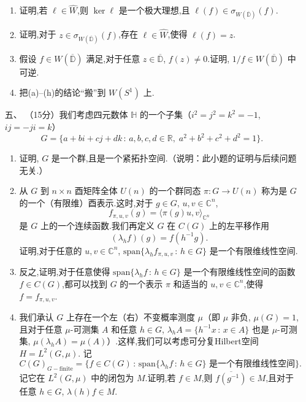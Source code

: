 \begin{enumerate}
\begin{enumerate}[label=(\alph*)]
\item 证明,若 $\ell\in \widehat{W}$,则 $\ker \ell$ 是一个极大理想,且 $\ell(f)\in \sigma_{W(\overline{\mathbb{D}})}(f)$.

\item 证明,对于 $z\in \sigma_{W(\overline{\mathbb{D}})}(f)$,存在 $\ell\in \widehat{W}$,使得 $\ell(f)=z$.

\item 假设 $f\in W(\overline{\mathbb{D}})$ 满足,对于任意 $z\in \overline{\mathbb{D}}$, $f(z)\neq 0$.证明, $1/f\in W(\overline{\mathbb{D}})$ 中可逆.

\item 把(a)--(h)的结论“搬”到 $W(S^1)$ 上.
\end{enumerate}

\item[五、]（15分）我们考虑四元数体 $\mathbb{H}$ 的一个子集（$i^2=j^2=k^2=-1$, $ij=-ji=k$）
$$
G=\{a+bi+cj+dk\,:\, a,b,c,d\in\mathbb{R},\; a^2+b^2+c^2+d^2=1\}.
$$

\begin{enumerate}[label=(\alph*)]
\item 证明, $G$ 是一个群,且是一个紧拓扑空间.（说明：此小题的证明与后续问题无关.）

\item 从 $G$ 到 $n\times n$ 酉矩阵全体 $U(n)$ 的一个群同态 $\pi:G\to U(n)$ 称为是 $G$ 的一个（有限维）酉表示.这时,对于 $g\in G$, $u,v\in \mathbb{C}^n$,
$$
f_{\pi,u,v}(g)=\langle \pi(g)u,v\rangle_{\mathbb{C}^n}
$$
是 $G$ 上的一个连续函数.我们再定义 $G$ 在 $C(G)$ 上的左平移作用
$$
(\lambda_h f)(g)=f(h^{-1}g).
$$
证明,对于任意的 $u,v\in \mathbb{C}^n$, $\mathrm{span}\{\lambda_h f_{\pi,u,v}\,:\, h\in G\}$ 是一个有限维线性空间.

\item 反之,证明,对于任意使得 $\mathrm{span}\{\lambda_h f\,:\, h\in G\}$ 是一个有限维线性空间的函数 $f\in C(G)$,都可以找到 $G$ 的一个表示 $\pi$ 和适当的 $u,v\in \mathbb{C}^n$,使得 $f=f_{\pi,u,v}$.

\item 我们承认 $G$ 上存在一个左（右）不变概率测度 $\mu$（即 $\mu$ 非负, $\mu(G)=1$,且对于任意 $\mu$-可测集 $A$ 和任意 $h\in G$, $\lambda_h A=\{h^{-1}x\,:\, x\in A\}$ 也是 $\mu$-可测集, $\mu(\lambda_h A)=\mu(A)$）.这样,我们可以考虑可分复Hilbert空间 $H=L^2(G,\mu)$.
记
$$
C(G)_{G-\mathrm{finite}}=\{f\in C(G)\,:\, \mathrm{span}\{\lambda_h f\,:\, h\in G\} \text{ 是一个有限维线性空间}\}.
$$
记它在 $L^2(G,\mu)$ 中的闭包为 $M$.证明,若 $f\in M$,则 $\overline{f(g^{-1})}\in M$,且对于任意 $h\in G$, $\lambda(h)f\in M$.


\end{enumerate}
\end{enumerate}
